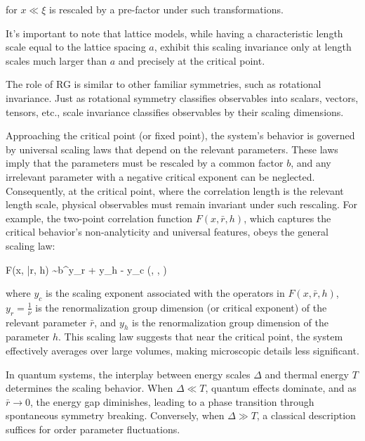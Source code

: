 for $ x \ll \xi $ is rescaled by a pre-factor under such transformations.


It's important to note that lattice models, while having a characteristic length scale equal to the lattice spacing $ a $, exhibit this scaling invariance only at length scales much larger than $ a $ and precisely at the critical point.


The role of RG is similar to other familiar symmetries, such as rotational invariance. Just as rotational symmetry classifies observables into scalars, vectors, tensors, etc., scale invariance classifies observables by their scaling dimensions.

Approaching the critical point (or fixed point), the system's behavior is governed by universal scaling laws that depend on the relevant parameters. These laws imply that the parameters must be rescaled by a common factor $ b $, and any irrelevant parameter with a negative critical exponent can be neglected. Consequently, at the critical point, where the correlation length is the relevant length scale, physical observables must remain invariant under such rescaling. For example, the two-point correlation function $ F(x, \bar{r}, h) $, which captures the critical behavior's non-analyticity and universal features, obeys the general scaling law:

F(x, \bar{r}, h) \sim b^{y_r + y_h - y_c} \left(, , \right)
\ea

where $ y_c $ is the scaling exponent associated with the operators in $ F(x, \bar{r}, h) $, $ y_r = \frac{1}{\nu} $ is the renormalization group dimension (or critical exponent) of the relevant parameter $ \bar{r} $, and $ y_h $ is the renormalization group dimension of the parameter $ h $. This scaling law suggests that near the critical point, the system effectively averages over large volumes, making microscopic details less significant.

$ $\\

In quantum systems, the interplay between energy scales $ \Delta $ and thermal energy $ T $ determines the scaling behavior. When $ \Delta \ll T $, quantum effects dominate, and as $ \bar{r} \rightarrow 0 $, the energy gap diminishes, leading to a phase transition through spontaneous symmetry breaking. Conversely, when $ \Delta \gg T $, a classical description suffices for order parameter fluctuations.

